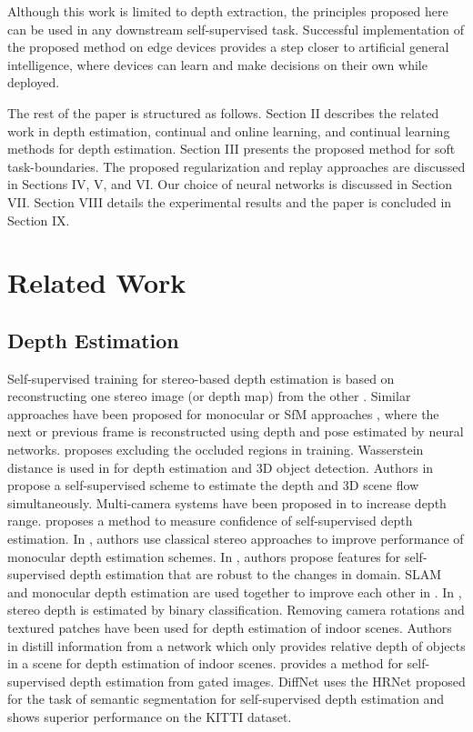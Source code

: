 \documentclass[lettersize,journal]{IEEEtran}
\begin{document}
 Although this work is limited to depth extraction, the principles proposed here can be used in any downstream self-supervised task. Successful implementation of the proposed method on edge devices provides a step closer to artificial general intelligence, where devices can learn and make decisions on their own while deployed.
 
 The rest of the paper is structured as follows. Section II describes the related work in depth estimation, continual and online learning, and continual learning methods for depth estimation. Section III presents the proposed method for soft task-boundaries. The proposed regularization and replay approaches are discussed in Sections IV, V, and VI. Our choice of neural networks is discussed in Section VII. Section VIII details the experimental results and the paper is concluded in Section IX.
 
 \section{Related Work}
 \subsection{Depth Estimation}
\noindent  Self-supervised training for stereo-based depth estimation is based on reconstructing one stereo image (or depth map) from the other \cite{garg2016unsupervised, godard2017unsupervised}. Similar approaches have been proposed for monocular or SfM approaches \cite{zhou2017unsupervised, godard2019digging}, where the next or previous frame is reconstructed using depth and pose estimated by neural networks. \cite{gonzalezbello2020forget} proposes excluding the occluded regions in training. Wasserstein distance is used in \cite{garg2020wasserstein} for depth estimation and 3D object detection. Authors in \cite{hur2020self} propose a self-supervised scheme to estimate the depth and 3D scene flow simultaneously. Multi-camera systems have been proposed in \cite{zhang2020depth,imran2020unsupervised} to increase depth range. \cite{poggi2020uncertainty} proposes a method to measure confidence of self-supervised depth estimation. In \cite{watson2019self}, authors use classical stereo approaches to improve performance of monocular depth estimation schemes. In \cite{spencer2020defeat}, authors propose features for self-supervised depth estimation that are robust to the changes in domain. SLAM and monocular depth estimation are used together to improve each other in \cite{tiwari2020pseudo}. In \cite{badki2020bi3d}, stereo depth is estimated by binary classification.  Removing camera rotations \cite{zhou2019moving} and textured patches \cite{yu2020p} have been used for depth estimation of indoor scenes. Authors in \cite{wu2021toward} distill information from a network which only provides relative depth of objects in a scene for depth estimation of indoor scenes. \cite{walia2022gated2gated} provides a method for self-supervised depth estimation from gated images. DiffNet \cite{zhou2021self} uses the HRNet \cite{wang2020deep} proposed for the task of semantic segmentation for self-supervised depth estimation and shows superior performance on the KITTI \cite{Menze2015CVPR} dataset.
 
\end{document}
